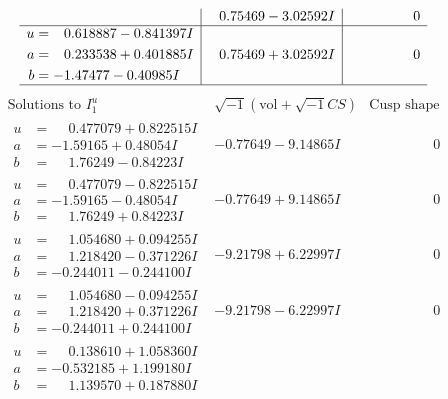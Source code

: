 \documentclass[1p]{elsarticle_modified}
\theoremstyle{definition}
\newcommand{\I}{\sqrt{-1}}
\begin{document}
$$\begin{array}{c|c|c}
 & \phantom{-}0.75469 - 3.02592 I & \phantom{-0.000000 } 0 \\ \hline\begin{aligned}
u &= \phantom{-}0.618887 - 0.841397 I \\
a &= \phantom{-}0.233538 + 0.401885 I \\
b &= -1.47477 - 0.40985 I\end{aligned}
 & \phantom{-}0.75469 + 3.02592 I & \phantom{-0.000000 } 0\\
 \hline 
 \end{array}$$\newpage$$\begin{array}{c|c|c}  
\text{Solutions to }I^u_{1}& \I (\text{vol} + \sqrt{-1}CS) & \text{Cusp shape}\\
 \hline 
\begin{aligned}
u &= \phantom{-}0.477079 + 0.822515 I \\
a &= -1.59165 + 0.48054 I \\
b &= \phantom{-}1.76249 - 0.84223 I\end{aligned}
 & -0.77649 - 9.14865 I & \phantom{-0.000000 } 0 \\ \hline\begin{aligned}
u &= \phantom{-}0.477079 - 0.822515 I \\
a &= -1.59165 - 0.48054 I \\
b &= \phantom{-}1.76249 + 0.84223 I\end{aligned}
 & -0.77649 + 9.14865 I & \phantom{-0.000000 } 0 \\ \hline\begin{aligned}
u &= \phantom{-}1.054680 + 0.094255 I \\
a &= \phantom{-}1.218420 - 0.371226 I \\
b &= -0.244011 - 0.244100 I\end{aligned}
 & -9.21798 + 6.22997 I & \phantom{-0.000000 } 0 \\ \hline\begin{aligned}
u &= \phantom{-}1.054680 - 0.094255 I \\
a &= \phantom{-}1.218420 + 0.371226 I \\
b &= -0.244011 + 0.244100 I\end{aligned}
 & -9.21798 - 6.22997 I & \phantom{-0.000000 } 0 \\ \hline\begin{aligned}
u &= \phantom{-}0.138610 + 1.058360 I \\
a &= -0.532185 + 1.199180 I \\
b &= \phantom{-}1.139570 + 0.187880 I\end{aligned}

\end{array}$$
\end{document}
